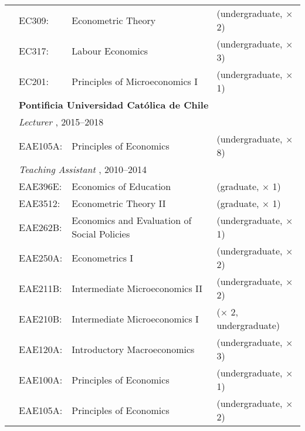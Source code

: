 \begin{tabular}{llll}
	  
	  \indent
	  
	& EC309:
	& Econometric Theory
	& (undergraduate, $\times$ 2)
	\\%
	
	& EC317:
	& Labour Economics
	& (undergraduate, $\times$ 3)
	\\%
	
	& EC201:
	& Principles of Microeconomics I
	& (undergraduate, $\times$ 1)
	\\[1em]
	
	
	&
	\multicolumn{3}{l}{
		\textbf{%
			Pontificia Universidad Cat\'olica de Chile
		}
	}
	\\[1ex]
	
	
	&
	\multicolumn{3}{l}{
		\textit{%
			Lecturer%
		}%
		,
		2015--2018
	}
	\\[.5ex]
	
	& EAE105A:
	& Principles of Economics
	& (undergraduate, $\times$ 8)
	\\[1em]
	
	
	&
	\multicolumn{3}{l}{
		\textit{%
			Teaching Assistant%
		}%
		,
		2010--2014
	}
	\\[.5ex]
	
	& EAE396E:
	& Economics of Education
	& (graduate, $\times$ 1)
	\\%
	
	& EAE3512:
	& Econometric Theory II
	& (graduate, $\times$ 1)
	\\%
	
	& EAE262B:
	& Economics and Evaluation of Social Policies\hphantom{ooo}
	& (undergraduate, $\times$ 1)
%	
	\\%
	
	& EAE250A:
	& Econometrics I
	& (undergraduate, $\times$ 2)
	\\%
	
	& EAE211B:
	& Intermediate Microeconomics II
	& (undergraduate, $\times$ 2)
	\\%
	
	& EAE210B:
	& Intermediate Microeconomics I
	& ($\times$ 2, undergraduate)
	\\%
	
	& EAE120A:
	& Introductory Macroeconomics
	& (undergraduate, $\times$ 3)
	\\%
	
	& EAE100A:
	& Principles of Economics
	& (undergraduate, $\times$ 1)
	\\%
	
	& EAE105A:
	& Principles of Economics
	& (undergraduate, $\times$ 2)
	\\%
	
\end{tabular}